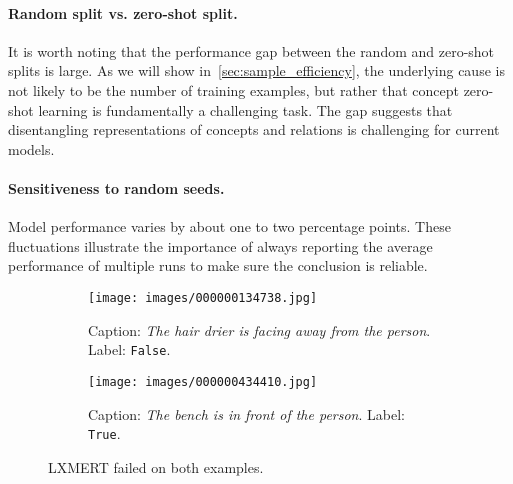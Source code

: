 \paragraph{Random split vs. zero-shot split.} 
It is worth noting that the performance gap between the random and zero-shot splits is large.
As we will show in~\cref{sec:sample_efficiency}, the underlying cause is not likely to be the number of training examples, but rather that concept zero-shot learning is fundamentally a challenging task.
The gap suggests that disentangling representations of concepts and relations is challenging for current models.

\paragraph{Sensitiveness to random seeds.}
Model performance varies by about one to two percentage points.
These fluctuations illustrate the importance of
always reporting the average performance of multiple runs to make sure the conclusion is reliable.



\begin{figure}[th!]
  \centering
        \centering
    \begin{subfigure}[b]{0.8\linewidth}
    \centering
    \texttt{[image: images/000000134738.jpg]}
    \caption{Caption: \textit{The hair drier is facing away from the person}. Label: \texttt{False}.}
     \end{subfigure}\hfill
     \begin{subfigure}[b]{0.8\linewidth}
         \centering
    \texttt{[image: images/000000434410.jpg]}
         \caption{Caption: \textit{The bench is in front of the person}. Label: \texttt{True}.}
     \end{subfigure}
    
    \caption{LXMERT failed on both examples.}
    \label{fig:hair_drier_facing}
\end{figure}


